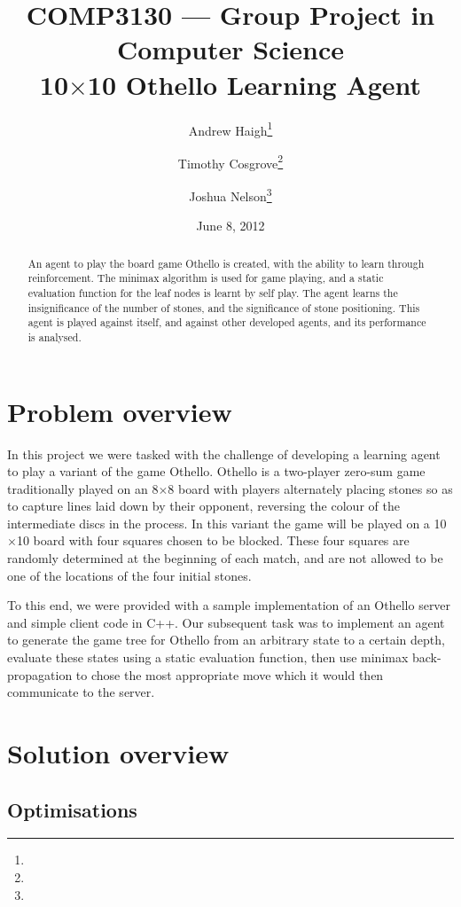 \documentclass[11pt]{article}
\title{%
  COMP3130 --- Group Project in Computer Science \\
  10$\times$10 Othello Learning Agent}
\date{June 8, 2012}
\author{%
  Andrew Haigh\thanks{\uid{u4667010}} \and %
  Timothy Cosgrove\thanks{\uid{u4843619}} \and
  Joshua Nelson\thanks{\uid{u4850020}}}
\begin{document}
\maketitle
\begin{abstract}
  \label{abstract}
  An agent to play the board game Othello is created, with the ability
  to learn through reinforcement. The minimax algorithm is used for game
  playing, and a static evaluation function for the leaf nodes is learnt by
  self play.  The agent learns the insignificance of the number of stones, and
  the significance of stone positioning. This agent is played against itself,
  and against other developed agents, and its performance is analysed.
\end{abstract}
\clearpage

\section{Problem overview}
\label{sec:problem_overview}
In this project we were tasked with the challenge of developing a learning
agent to play a variant of the game Othello. Othello is a two-player zero-sum
game traditionally played on an 8$\times$8 board with players alternately
placing stones so as to capture lines laid down by their opponent, reversing
the colour of the intermediate discs in the process.
In this variant the game will be played on a 10$\times$10 board with four
squares chosen to be blocked. These four squares are randomly determined at
the beginning of each match, and are not allowed to be one of the
locations of the four initial stones.

To this end, we were provided with a sample implementation of an Othello
server and simple client code in C++. Our subsequent task was to implement an
agent to generate the game tree for Othello from an arbitrary state to a
certain depth, evaluate these states using a static evaluation function, then
use minimax back-propagation to chose the most appropriate move which it would
then communicate to the server.

\section{Solution overview}
\label{sec:solution_overview}

\subsection{Optimisations}
\label{sub:optimisations}
\end{document}
